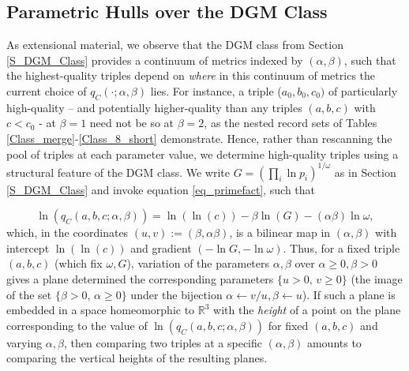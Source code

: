 \documentclass[11pt,letterpaper]{amsart}
\def\R{\mathbb{R}}
\def\R{\mathbb{R}}
\begin{document}
\subsection{Parametric Hulls over the DGM Class}

As extensional material, we observe that the DGM class from Section \ref{S_DGM_Class} provides a continuum of metrics indexed by $(\alpha,\beta)$, such that the highest-quality triples depend on \textit{where} in this continuum of metrics the current choice of $q_{C}(\cdot; \alpha, \beta)$ lies. 
For instance, a triple ($a_0, b_0, c_0)$ of particularly high-quality – and potentially higher-quality than any triples $(a, b, c)$ with $c < c_0$ - at $\beta=1$ need not be so at $\beta=2$, as the nested record sets of Tables \ref{Class_merge}-\ref{Class_8_short} demonstrate. 
Hence, rather than rescanning the pool of triples at each parameter value, we determine high-quality triples using a structural feature of the DGM class. We write $G=(\prod_i\ln p_i)^{1/\omega}$ as in Section \ref{S_DGM_Class} and invoke equation \eqref{eq_primefact}, such that

  \[
      \ln (q_C(a,b,c;\alpha,\beta))=\ln(\ln (c)) -\beta\ln (G) -(\alpha\beta)\ln\omega,
  \]
  which, in the coordinates $(u,v):=(\beta, \alpha\beta)$, is a bilinear map in $(\alpha, \beta)$ with intercept $\ln(\ln (c))$ and gradient $(-\ln G,-\ln\omega)$. Thus, for a fixed triple $(a, b, c)$ (which fix $\omega, G$), variation of the parameters $\alpha, \beta$ over $\alpha \ge 0, \beta > 0$ gives a plane determined the corresponding parameters $\{u>0,\,v\ge 0\}$ (the image of the set $\{\beta>0,\,\alpha\ge 0\}$ under the bijection $\alpha \gets v/u, \beta \gets u$). If such a plane is embedded in a space homeomorphic to $\R^3$ with the \textit{height} of a point on the plane corresponding to the value of $ \ln (q_C(a, b, c; \alpha, \beta))$ for fixed $(a, b, c)$ and varying $\alpha, \beta$, then comparing two triples at a specific $(\alpha, \beta)$ amounts to comparing the vertical heights of the resulting planes.
\end{document}
